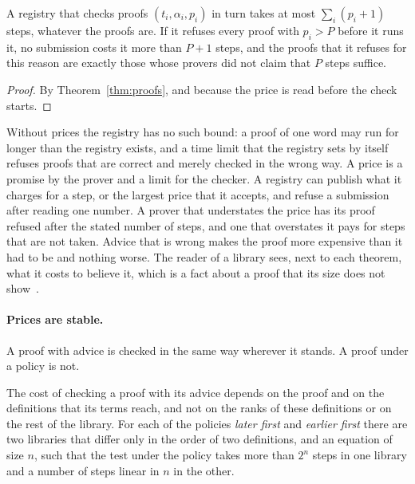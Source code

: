 \documentclass[acmsmall,nonacm,screen]{acmart}
\begin{document}
\begin{proposition}[Budget]
\label{prop:budget}
A registry that checks proofs $(t_i, \alpha_i, p_i)$ in turn takes at most $\sum_i (p_i + 1)$
steps, whatever the proofs are. If it refuses every proof with $p_i > P$ before it runs it,
no submission costs it more than $P + 1$ steps, and the proofs that it refuses for this
reason are exactly those whose provers did not claim that $P$ steps suffice.
\end{proposition}

\begin{proof}
By Theorem~\ref{thm:proofs}, and because the price is read before the check starts.
\end{proof}

Without prices the registry has no such bound: a proof of one word may run for longer than
the registry exists, and a time limit that the registry sets by itself refuses proofs that
are correct and merely checked in the wrong way. A price is a promise by the prover and a
limit for the checker. A
registry can publish what it charges for a step, or the largest price that it accepts, and
refuse a submission after reading one number. A prover that understates the price has its
proof refused after the stated number of steps, and one that overstates it pays for steps
that are not taken. Advice that is wrong makes the proof more expensive than it had to be
and nothing worse. The reader of a library sees, next to each theorem, what it costs to
believe it, which is a fact about a proof that its size does not show~\cite{tpp1}.

\paragraph{Prices are stable.} A proof with advice is checked in the same way wherever it
stands. A proof under a policy is not.

\begin{proposition}[Stability]
\label{prop:stable}
The cost of checking a proof with its advice depends on the proof and on the definitions that
its terms reach, and not on the ranks of these definitions or on the rest of the library. For
each of the policies \emph{later first} and \emph{earlier first} there are two libraries that
differ only in the order of two definitions, and an equation of size $n$, such that the test
under the policy takes more than $2^n$ steps in one library and a number of steps linear in
$n$ in the other.
\end{proposition}
\end{document}
